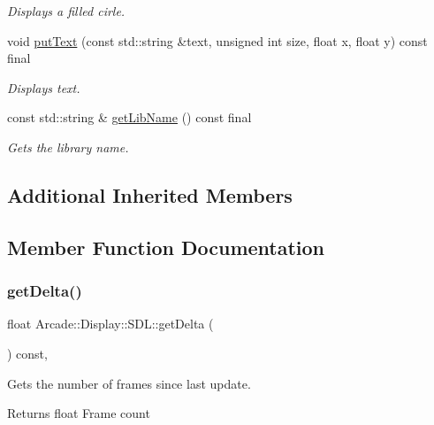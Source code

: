 \begin{DoxyCompactItemize}
\begin{DoxyCompactList}\small\item\em Displays a filled cirle. \end{DoxyCompactList}\item 
void \mbox{\hyperlink{classArcade_1_1Display_1_1SDL_aa3bd454c083beb16300bb799ed268ef7}{put\+Text}} (const std\+::string \&text, unsigned int size, float x, float y) const final
\begin{DoxyCompactList}\small\item\em Displays text. \end{DoxyCompactList}\item 
const std\+::string \& \mbox{\hyperlink{classArcade_1_1Display_1_1SDL_aa549d6ec470b99b545db63a1d4a2b58e}{get\+Lib\+Name}} () const final
\begin{DoxyCompactList}\small\item\em Gets the library name. \end{DoxyCompactList}\end{DoxyCompactItemize}
\subsection*{Additional Inherited Members}


\subsection{Member Function Documentation}
\mbox{\label{classArcade_1_1Display_1_1SDL_a1ca09d130dea3bec2481eb72a49c0f03}} 
\subsubsection{\texorpdfstring{getDelta()}{getDelta()}}
{\footnotesize\ttfamily float Arcade\+::\+Display\+::\+S\+D\+L\+::get\+Delta (\begin{DoxyParamCaption}{ }\end{DoxyParamCaption}) const\hspace{0.3cm}{\ttfamily [final]}, {\ttfamily [virtual]}}



Gets the number of frames since last update. 

\begin{DoxyReturn}{Returns}
float Frame count 
\end{DoxyReturn}



